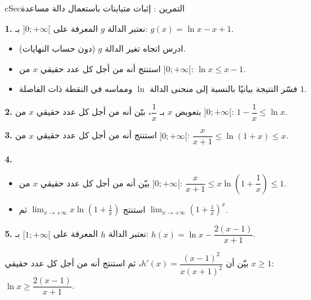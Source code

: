 \documentclass[12pt,a4paper]{article}
\newenvironment{BOX}[2]{\begin{otherlanguage}{english}\begin{arbox}{#1}{#2}}{\end{arbox}\end{otherlanguage}}
\newcounter{exo}
\newenvironment{tamrin}[1]{\stepcounter{exo}\begin{BOX}{cSec}{التمرين \theexo: #1}}{\end{BOX}}
\newenvironment{sq}{\begin{itemize}[leftmargin=2.4em,itemsep=3pt]}{\end{itemize}}
\newcommand{\qa}{\item[(أ)]}\newcommand{\qb}{\item[(ب)]}\newcommand{\qc}{\item[(جـ)]}\newcommand{\qd}{\item[(د)]}\newcommand{\qe}{\item[(هـ)]}
\newcommand{\QQ}[1]{\par\smallskip\textbf{#1.} }
\begin{document}
\begin{tamrin}{إثبات متباينات باستعمال دالة مساعدة}
\QQ{1} نعتبر الدالة $g$ المعرفة على $]0;+\infty[$ بـ: $g(x)=\ln x-x+1$.
\begin{sq}
\qa ادرس اتجاه تغير الدالة $g$ (دون حساب النهايات).
\qb استنتج أنه من أجل كل عدد حقيقي $x$ من $]0;+\infty[$: $\ln x\leqslant x-1$.
\qc فسّر النتيجة بيانيًا بالنسبة إلى منحنى الدالة $\ln$ ومماسه في النقطة ذات الفاصلة $1$.
\end{sq}
\QQ{2} بتعويض $x$ بـ $\dfrac1x$، بيّن أنه من أجل كل عدد حقيقي $x$ من $]0;+\infty[$: $1-\dfrac1x\leqslant\ln x$.
\QQ{3} استنتج أنه من أجل كل عدد حقيقي $x$ من $]0;+\infty[$: $\dfrac{x}{x+1}\leqslant\ln(1+x)\leqslant x$.
\QQ{4}
\begin{sq}
\qa بيّن أنه من أجل كل عدد حقيقي $x$ من $]0;+\infty[$: $\dfrac{x}{x+1}\leqslant x\ln\left(1+\dfrac1x\right)\leqslant 1$.
\qb استنتج $\displaystyle\lim_{x\to+\infty}x\ln\left(1+\frac1x\right)$ ثم $\displaystyle\lim_{x\to+\infty}\left(1+\frac1x\right)^{x}$.
\end{sq}
\QQ{5} نعتبر الدالة $h$ المعرفة على $[1;+\infty[$ بـ: $h(x)=\ln x-\dfrac{2(x-1)}{x+1}$.

بيّن أن $h'(x)=\dfrac{(x-1)^2}{x(x+1)^2}$، ثم استنتج أنه من أجل كل عدد حقيقي $x\geqslant1$: $\ln x\geqslant\dfrac{2(x-1)}{x+1}$.
\end{tamrin}
\end{document}
